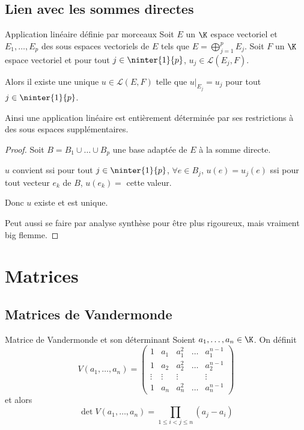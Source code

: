 \subsection{Lien avec les sommes directes}

\begin{theoreme}{Application linéaire définie par morceaux}{}
    Soit $E$ un $\K$ espace vectoriel et $E_1, \dots, E_p$ des sous espaces vectoriels de $E$ tels que 
    $E = \bigoplus_{j=1}^p E_j$. Soit $F$ un $\K$ espace vectoriel et pour tout $j \in \ninter{1}{p}$,
    $u_j \in \mathscr L(E_j, F)$.

    Alors il existe une unique $u \in \mathscr L(E, F)$ telle que 
    $u|_{E_j} = u_j$ pour tout $j \in \ninter{1}{p}$.

    Ainsi une application linéaire est entièrement déterminée par ses restrictions à 
    des sous espaces supplémentaires.
\end{theoreme}

\begin{proof}
    Soit $B = B_1 \cup \dots \cup B_p$ une base adaptée de $E$ à la somme directe.

    $u$ convient ssi pour tout $j \in \ninter{1}{p}$, $\forall e \in B_j$, $u(e) = u_j(e)$ 
    ssi pour tout vecteur $e_k$ de $B$, $u(e_k) = $ cette valeur. 

    Donc $u$ existe et est unique. 

    Peut aussi se faire par analyse synthèse pour être plus rigoureux, mais vraiment 
    big flemme. 
\end{proof}


\section{Matrices }
\subsection{Matrices de Vandermonde}

\begin{definition}{Matrice de Vandermonde et son déterminant}{}
    Soient $a_1, \dots, a_n \in \K$. On définit 
    $$ V (a_1, \dots, a_n) = \begin{pmatrix}
        1 & a_1 & a_1^2 & \dots & a_1^{n-1} \\
        1 & a_2 & a_2^2 & \dots & a_2^{n-1} \\
        \vdots & \vdots & \vdots & & \vdots \\
        1 & a_n & a_n^2 & \dots & a_n^{n-1}
    \end{pmatrix}$$ et alors 
    $$ \det V(a_1, \dots, a_n) = \prod_{1 \leqslant i < j \leqslant n} (a_j - a_i) $$
\end{definition}

